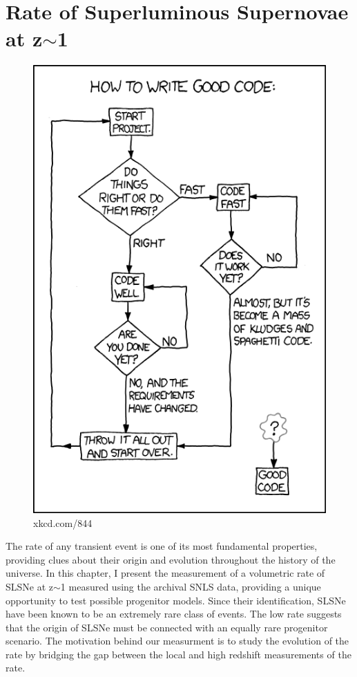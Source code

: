 \chapter{Rate of Superluminous Supernovae at z$\sim$1}
\label{Chapter4}

\begin{figure}[H]
  \centering
  \includegraphics{Figures/xkcd/chapter4.png}
  \caption*{xkcd.com/844}
\end{figure}

The rate of any transient event is one of its most fundamental properties, providing clues about their origin and evolution throughout the history of the universe. In this chapter, I present the measurement of a volumetric rate of SLSNe at z$\sim$1 measured using the archival SNLS data, providing a unique opportunity to test possible progenitor models. Since their identification, SLSNe have been known to be an extremely rare class of events. The low rate suggests that the origin of SLSNe must be connected with an equally rare progenitor scenario. The motivation behind our measurment is to study the evolution of the rate by bridging the gap between the local and high redshift measurements of the rate.


